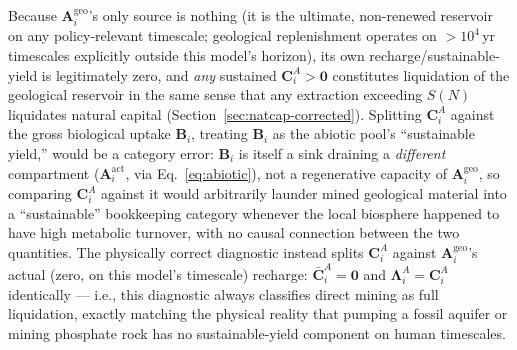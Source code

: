 \documentclass[twocolumn,10pt]{article}
\begin{document}
Because $\mathbf A^{\text{geo}}_i$'s only source is nothing (it is the ultimate, non-renewed reservoir on any policy-relevant timescale; geological replenishment operates on $>10^4$\,yr timescales explicitly outside this model's horizon), its own recharge/sustainable-yield is legitimately zero, and \emph{any} sustained $\mathbf C^A_i>\mathbf 0$ constitutes liquidation of the geological reservoir in the same sense that any extraction exceeding $S(N)$ liquidates natural capital (Section~\ref{sec:natcap-corrected}). Splitting $\mathbf C^A_i$ against the gross biological uptake $\mathbf B_i$, treating $\mathbf B_i$ as the abiotic pool's ``sustainable yield,'' would be a category error: $\mathbf B_i$ is itself a sink draining a \emph{different} compartment ($\mathbf A^{\text{act}}_i$, via Eq.~\eqref{eq:abiotic}), not a regenerative capacity of $\mathbf A^{\text{geo}}_i$, so comparing $\mathbf C^A_i$ against it would arbitrarily launder mined geological material into a ``sustainable'' bookkeeping category whenever the local biosphere happened to have high metabolic turnover, with no causal connection between the two quantities. The physically correct diagnostic instead splits $\mathbf C^A_i$ against $\mathbf A^{\text{geo}}_i$'s actual (zero, on this model's timescale) recharge: $\bar{\mathbf C}^A_i=\mathbf 0$ and $\boldsymbol\Lambda^A_i=\mathbf C^A_i$ identically — i.e., this diagnostic always classifies direct mining as full liquidation, exactly matching the physical reality that pumping a fossil aquifer or mining phosphate rock has no sustainable-yield component on human timescales.
\end{document}

